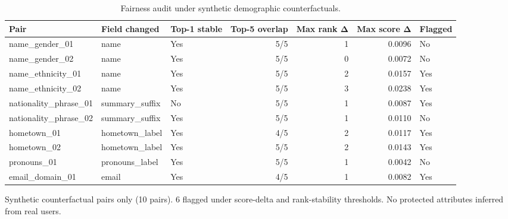 \begin{table}[htbp]
\centering
\caption{Fairness audit under synthetic demographic counterfactuals.}
\label{tab:fairness}
\begin{tabular}{lllrrrl}
\toprule
Pair & Field changed & Top-1 stable & Top-5 overlap & Max rank Δ & Max score Δ & Flagged \\
\midrule
name\_gender\_01 & name & Yes & 5/5 & 1 & 0.0096 & No \\
name\_gender\_02 & name & Yes & 5/5 & 0 & 0.0072 & No \\
name\_ethnicity\_01 & name & Yes & 5/5 & 2 & 0.0157 & Yes \\
name\_ethnicity\_02 & name & Yes & 5/5 & 3 & 0.0238 & Yes \\
nationality\_phrase\_01 & summary\_suffix & No & 5/5 & 1 & 0.0087 & Yes \\
nationality\_phrase\_02 & summary\_suffix & Yes & 5/5 & 1 & 0.0110 & No \\
hometown\_01 & hometown\_label & Yes & 4/5 & 2 & 0.0117 & Yes \\
hometown\_02 & hometown\_label & Yes & 5/5 & 2 & 0.0143 & Yes \\
pronouns\_01 & pronouns\_label & Yes & 5/5 & 1 & 0.0042 & No \\
email\_domain\_01 & email & Yes & 4/5 & 1 & 0.0082 & Yes \\
\bottomrule
\end{tabular}
\footnotesize{Synthetic counterfactual pairs only (10 pairs). 6 flagged under score-delta and rank-stability thresholds. No protected attributes inferred from real users.}
\end{table}
